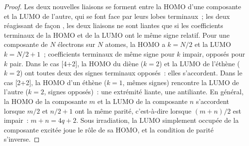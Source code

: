 \begin{proof}
Les deux nouvelles liaisons se forment entre la HOMO d'une composante et la
LUMO de l'autre, qui se font face par leurs lobes terminaux~; les deux
réagissant de façon , les deux liaisons ne sont liantes que si
les coefficients terminaux de la HOMO et de la LUMO ont le même signe
relatif. Pour une composante de $N$
électrons sur $N$ atomes, la HOMO a $k = N/2$ et la LUMO $k = N/2 + 1$~; coefficients terminaux de
même signe pour $k$ impair, opposés pour $k$ pair. Dans le cas [4+2], la HOMO du diène ($k = 2$)
et la LUMO de l'éthène ($k = 2$) ont toutes deux des signes terminaux opposés~: elles s'accordent. Dans le
cas [2+2], la HOMO d'un éthène ($k = 1$, mêmes signes) rencontre la LUMO de l'autre
($k = 2$, signes opposés)~: une extrémité liante, une antiliante. En général, la HOMO de la composante $m$
et la LUMO de la composante $n$ s'accordent lorsque $m/2$ et $n/2 + 1$ ont la même
parité, c'est-à-dire lorsque $(m + n)/2$ est impair~: $m + n = 4q + 2$. Sous irradiation, la LUMO
simplement occupée de la composante excitée joue le rôle de sa HOMO, et la
condition de parité s'inverse.
\end{proof}

